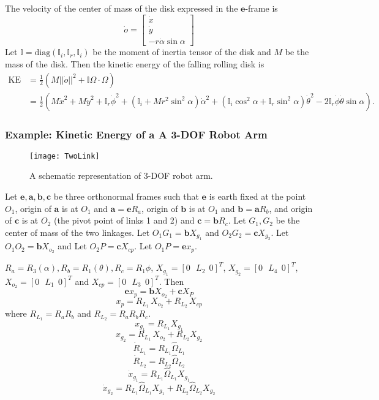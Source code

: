 \documentclass[graybox,envcountchap,sectrefs]{svmonoMuga}
\begin{document}
The velocity of the center of mass of the disk expressed in the $\mathbf{e}$-frame is
\[
\dot{o}=\left[\begin{array}{c} \dot{x}\\\dot{y} \\ -r\dot{\alpha}\sin{\alpha}
\end{array}\right]
\]
Let $\mathbb{I}=\mathrm{diag}(\mathbb{I}_i,\mathbb{I}_r,\mathbb{I}_i)$ be the moment of inertia tensor of the disk and $M$ be the mass of the disk. Then the kinetic energy of the falling rolling disk is
\begin{align*}
\mathrm{KE}&=\frac{1}{2}\left(M||\dot{o}||^2+\mathbb{I}\Omega \cdot \Omega\right)\\
&=\frac{1}{2}\left(M\dot{x}^2+M\dot{y}^2+\mathbb{I}_r\dot{\phi}^2+(\mathbb{I}_i+Mr^2\sin^2{\alpha})\dot{\alpha}^2
+(\mathbb{I}_i\cos^2{\alpha}+\mathbb{I}_r\sin^2{\alpha})\dot{\theta}^2-2\mathbb{I}_r\dot{\phi}\dot{\theta}\sin{\alpha}\right).
\end{align*}

\subsubsection*{Example: Kinetic Energy of a A 3-DOF Robot Arm} \label{Secn:3DOF_RobotArm}
\begin{figure}[ht]
\begin{center}
\texttt{[image: TwoLink]}
\renewcommand{\baselinestretch}{1}\selectfont
\caption{A schematic representation of 3-DOF robot arm.}
\label{Fig:3DOF_RobotArm}
\end{center}
\end{figure}

Let $\mathbf{e,a,b,c}$ be three orthonormal frames such that $\mathbf{e}$ is earth fixed at the point $O_1$, origin of $\mathbf{a}$ is at $O_1$ and $\mathbf{a}=\mathbf{e}R_a$, origin of $\mathbf{b}$ is at $O_1$ and $\mathbf{b}=\mathbf{a}R_b$, and origin of $\mathbf{c}$ is at $O_2$ (the pivot point of links 1 and 2) and $\mathbf{c}=\mathbf{b}R_c$. Let $G_1,G_2$ be the center of mass of the two linkages. Let $O_1G_1=\mathbf{b}X_{g_1}$ and $O_2G_2=\mathbf{c}X_{g_2}$. Let $O_1O_2=\mathbf{b}X_{o_2}$  and Let $O_2P=\mathbf{c}X_{cp}$.  Let $O_1P=\mathbf{e}x_p$.

$R_a=R_3(\alpha),R_b=R_1(\theta),R_c=R_1{\phi}$, $X_{g_1}=[0\:\:\:L_2\:\:0]^T$, $X_{g_2}=[0\:\:\:L_4\:\:0]^T$, $X_{o_2}=[0\:\:\:L_1\:\:0]^T$ and $X_{cp}=[0\:\:\:L_3\:\:0]^T$.
Then
\[
\mathbf{e}x_p=\mathbf{b}X_{o_2}+\mathbf{c}X_{P}
\]
\[
x_p=R_{L_1}\,X_{o_2}+R_{L_2}\,X_{cp}
\]
where $R_{L_1}=R_aR_b$ and $R_{L_2}=R_aR_bR_c$.
\[
x_{g_1}=R_{L_1}X_{g_1}
\]
\[
x_{g_2}=R_{L_1}\,X_{o_2}+R_{L_2}X_{g_2}
\]
\[
\dot{R}_{L_1}=R_{L_1}\widehat{\Omega}_{L_1}
\]
\[
\dot{R}_{L_2}=R_{L_2}\widehat{\Omega}_{L_2}
\]
\[
\dot{x}_{g_1}=R_{L_1}\widehat{\Omega}_{L_1}X_{g_1}
\]
\[
\dot{x}_{g_2}=R_{L_1}\widehat{\Omega}_{L_1}X_{g_1}+R_{L_2}\widehat{\Omega}_{L_2}X_{g_2}
\]
\end{document}
